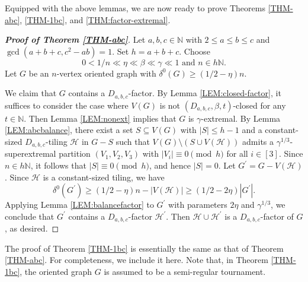 \documentclass[11pt,a4paper,reqno]{amsart}
\theoremstyle{definition} %
\begin{document}
Equipped with the above lemmas, we are now ready to prove Theorems \ref{THM-abc}, \ref{THM-1bc}, and \ref{THM:factor-extremal}.

\begin{proof}[\textbf{Proof of Theorem \ref{THM-abc}}]
Let $a,b,c\in \mathbb{N}$ with $2\leqslant a \leqslant b \leqslant c$ and $\gcd(a+b+c,c^2-ab)=1$. Set $h=a+b+c$. Choose
$$
0< 1/n\ll\eta\ll \beta\ll\gamma\ll 1
\text{ and }
n\in h\mathbb{N}.
$$
Let $G$ be an $n$-vertex oriented graph with $\delta^0(G)\geqslant (1/2-\eta)n$.

We claim that $G$ contains a $D_{a,b,c}$-factor. By Lemma \ref{LEM:closed-factor}, it suffices to consider the case where $V(G)$ is not $(D_{a,b,c},\beta,t)$-closed for any $t\in\mathbb{N}$. Then Lemma \ref{LEM:nonext} implies that $G$ is $\gamma$-extremal. By Lemma \ref{LEM:abcbalance}, there exist a set $S\subseteq V(G)$ with $|S|\leqslant h-1$ and a constant-sized $D_{a,b,c}$-tiling $\mathcal{H}$ in $G-S$ such that $V(G)\setminus (S\cup V(\mathcal{H}))$ admits a $\gamma^{1/3}$-superextremal partition $(V_1,V_2,V_3)$ with $|V_i|\equiv 0\pmod h$ for all $i\in[3]$. Since $n\in h\mathbb{N}$, it follows that $|S|\equiv 0\pmod h$, and hence $|S|=0$. Let $G^\prime=G-V(\mathcal{H})$. Since $\mathcal{H}$ is a constant-sized tiling, we have
$$
\delta^0(G^\prime)\geqslant (1/2-\eta)n-|V(\mathcal{H})|
\geqslant (1/2-2\eta)|G^\prime|.
$$
Applying Lemma \ref{LEM:balancefactor} to $G^\prime$ with parameters $2\eta$ and $\gamma^{1/3}$, we conclude that $G^\prime$ contains a $D_{a,b,c}$-factor $\mathcal{H}^\prime$. Then $\mathcal{H}\cup\mathcal{H}^\prime$ is a $D_{a,b,c}$-factor of $G$, as desired.
\end{proof}


The proof of Theorem \ref{THM-1bc} is essentially the same as that of Theorem \ref{THM-abc}. For completeness, we include it here. Note that, in Theorem \ref{THM-1bc}, the oriented graph $G$ is assumed to be a semi-regular tournament.
\end{document}
